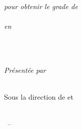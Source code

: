 \begin{titlepage}

\begin{addmargin}[-1cm]{-3cm}
\begin{center}
\large

\hfill
\vfill

\begingroup
{}\\\medskip
\textit{pour obtenir le grade de}\\\medskip
{}\\\medskip
\textit{en }\\\medskip
{}\\\vspace{1cm}
\endgroup

\vfill

\begingroup
\textbf{\spacedallcaps{\myTitle}} \\ \bigskip %
\endgroup

\vfill





\textit{Présentée par}\\\medskip
\spacedlowsmallcaps{\myName}\\ %
\bigskip


Sous la direction de \myProf et \myOtherProf \\ \medskip
\myDepartment \\  \medskip

\hspace{1.5cm}

\myTime\ -- \myVersion %

\hspace{1.5cm}


\end{center}
\end{addmargin}
\end{titlepage}
